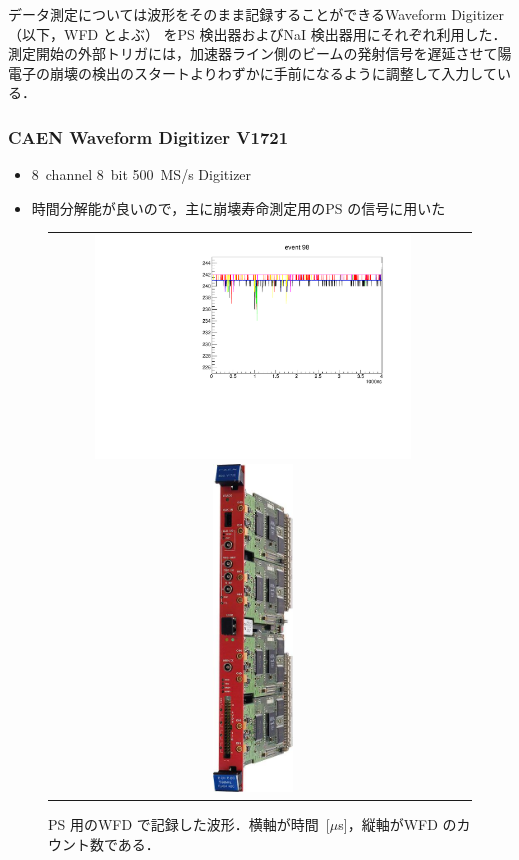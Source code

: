 データ測定については波形をそのまま記録することができるWaveform Digitizer （以下，WFD とよぶ） をPS 検出器およびNaI 検出器用にそれぞれ利用した．測定開始の外部トリガには，加速器ライン側のビームの発射信号を遅延させて陽電子の崩壊の検出のスタートよりわずかに手前になるように調整して入力している．

\subsubsection{CAEN Waveform Digitizer V1721}
\begin{itemize}
\item 8~channel 8~bit 500~MS/s Digitizer
\item 時間分解能が良いので，主に崩壊寿命測定用のPS の信号に用いた
\end{itemize}
\begin{figure}[H]
\begin{tabular}{cc}
\begin{minipage}{0.5\hsize}
\centering
\includegraphics[width=0.8\textwidth]{figure/hayakawa/ps_plot.pdf}
\caption{PS 用のWFD で記録した波形．横軸が時間~[$\mu$s]，縦軸がWFD のカウント数である．}
\end{minipage}
\begin{minipage}{0.4\hsize}
\centering
\includegraphics[width=0.2\textwidth]{figure/hayakawa/1095_L.jpg}
\end{minipage}
\end{tabular}
\end{figure}

